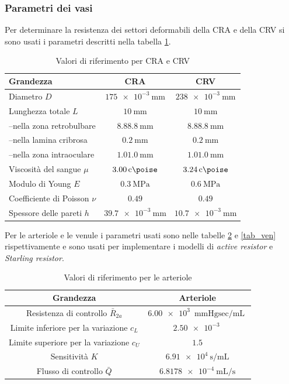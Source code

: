 \documentclass{article}
\begin{document}
\subsubsection*{Parametri dei vasi}
Per determinare la resistenza dei settori deformabili della CRA e della CRV si sono usati i parametri descritti nella tabella \ref{tab_CR}.
\begin{table}[h!]
\begin{center}
\begin{tabular}{| l | c | c |}
\hline
\textbf{Grandezza} & \textbf{CRA} & \textbf{CRV}\\
\hline
Diametro $D$& $\SI{175e-3}{\milli \meter}$ &  $\SI{238e-3}{\milli \meter}$\\
Lunghezza totale $L$ & $\SI{10}{\milli \meter}$ &  $\SI{10}{\milli \meter}$\\
--nella zona retrobulbare & $8.8 \SI{8.8}{\milli \meter}$ & $8.8 \SI{8.8}{\milli \meter}$\\
--nella lamina cribrosa  & $\SI{0.2}{\milli \meter}$ & $\SI{0.2}{\milli \meter}$\\
--nella zona intraoculare  & $1.0\SI{1.0}{\milli \meter}$ & $1.0\SI{1.0}{\milli \meter}$\\
Viscosità del sangue $\mu$ & $\SI{3.00}{\centi \poise}$ & $\SI{3.24}{\centi \poise}$\\
Modulo di Young $E$ & $\SI{0.3}{\mega\pascal}$ & $\SI{0.6}{\mega\pascal}$\\
Coefficiente di Poisson $\nu$ & $0.49$ & $0.49$\\
Spessore delle pareti $h$ & $\SI{39.7e-3}{\milli\meter}$ & $\SI{10.7e-3}{\milli\meter}$\\
\hline
\end{tabular}
\caption{Valori di riferimento per CRA e CRV}
\label{tab_CR}
\end{center}
\end{table}

Per le arteriole e le venule i parametri usati sono nelle tabelle \ref{tab_art} e \ref{tab_ven} rispettivamente e sono usati per implementare i modelli di \textit{active resistor} e \textit{Starling resistor}.

\begin{table}[h!]
\begin{center}
\begin{tabular}{| c | c |}
\hline
\textbf{Grandezza} & \textbf{Arteriole}\\
\hline
Resistenza di controllo $\bar{R}_{2a}$ & $ \SI{6.00e3}{\mmHg \sec \per \milli \liter}$ \\
Limite inferiore per la variazione $c_L$ & $\SI{2.50e-3}{}$\\
Limite superiore per la variazione $c_U$ & $1.5$\\
Sensitività $K$ & $\SI{6.91e4}{\second \per \milli \liter}$\\
Flusso di controllo $\bar{Q}$ & $\SI{6.8178e-4}{\milli \liter \per \second}$\\
\hline
\end{tabular}
\caption{Valori di riferimento per le arteriole}
\label{tab_art}
\end{center}
\end{table}
\end{document}
